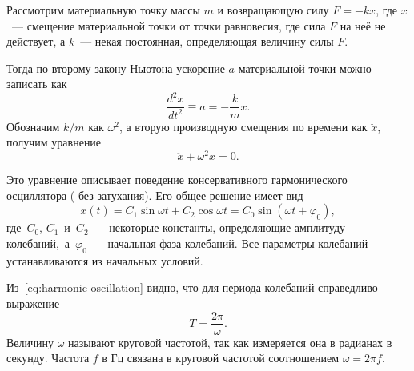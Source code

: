 Рассмотрим материальную точку массы $m$ и возвращающую силу $F = -kx$, где $x$~--- смещение материальной точки от точки равновесия, где сила $F$ на неё не действует, а $k$~--- некая постоянная, определяющая величину силы $F$.

Тогда по второму закону Ньютона ускорение $a$ материальной точки можно записать как
\begin{equation*}
    \frac{d^2 x}{dt^2} \equiv a = - \frac{k}{m} x.
\end{equation*}
Обозначим $k/m$ как $\omega^2$, а вторую производную смещения по времени как $\ddot x$, получим уравнение
\begin{equation}
    \ddot x + \omega^2 x = 0.
\end{equation}

Это уравнение описывает поведение консервативного гармонического осциллятора ( без затухания). Его общее решение имеет вид
\begin{equation}
	x(t) = C_1 \sin \omega t + C_2 \cos \omega t = C_0 \sin (\omega t + \varphi_0),
	\label{eq:harmonic-oscillation}
\end{equation}
где~$C_0$, $C_1$~и~$C_2$~--- некоторые константы, определяющие амплитуду колебаний,~а~$\varphi_0$~--- начальная фаза колебаний. Все параметры колебаний устанавливаются из начальных условий. 

Из~\eqref{eq:harmonic-oscillation} видно, что для периода колебаний справедливо выражение
\begin{equation}
	T = \frac{2 \pi}{\omega}.
\end{equation}
Величину $\omega$ называют круговой частотой, так как измеряется она в радианах в секунду. Частота $f$ в Гц связана в круговой частотой соотношением $\omega = 2 \pi f$.





